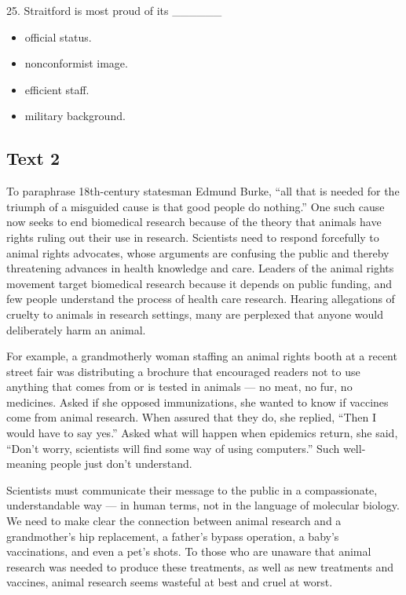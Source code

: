 \documentclass[UTF8,11pt]{ctexart}
\begin{document}
25. Straitford is most proud of its \_\_\_\_\_\_


\begin{itemize}[leftmargin=2em,itemsep=.2em,topsep=.4em]\item[A.] official status.
\item[B.] nonconformist image.
\item[C.] efficient staff.
\item[D.] military background.
\end{itemize}

\subsection*{\textbf{Text 2}}


To paraphrase 18th-century statesman Edmund Burke, “all that is needed for the triumph of a misguided cause is that good people do nothing.” One such cause now seeks to end biomedical research because of the theory that animals have rights ruling out their use in research. Scientists need to respond forcefully to animal rights advocates, whose arguments are confusing the public and thereby threatening advances in health knowledge and care. Leaders of the animal rights movement target biomedical research because it depends on public funding, and few people understand the process of health care research. Hearing allegations of cruelty to animals in research settings, many are perplexed that anyone would deliberately harm an animal.


For example, a grandmotherly woman staffing an animal rights booth at a recent street fair was distributing a brochure that encouraged readers not to use anything that comes from or is tested in animals — no meat, no fur, no medicines. Asked if she opposed immunizations, she wanted to know if vaccines come from animal research. When assured that they do, she replied, “Then I would have to say yes.” Asked what will happen when epidemics return, she said, “Don’t worry, scientists will find some way of using computers.” Such well-meaning people just don’t understand.


Scientists must communicate their message to the public in a compassionate, understandable way — in human terms, not in the language of molecular biology. We need to make clear the connection between animal research and a grandmother’s hip replacement, a father’s bypass operation, a baby’s vaccinations, and even a pet’s shots. To those who are unaware that animal research was needed to produce these treatments, as well as new treatments and vaccines, animal research seems wasteful at best and cruel at worst.
\end{document}
